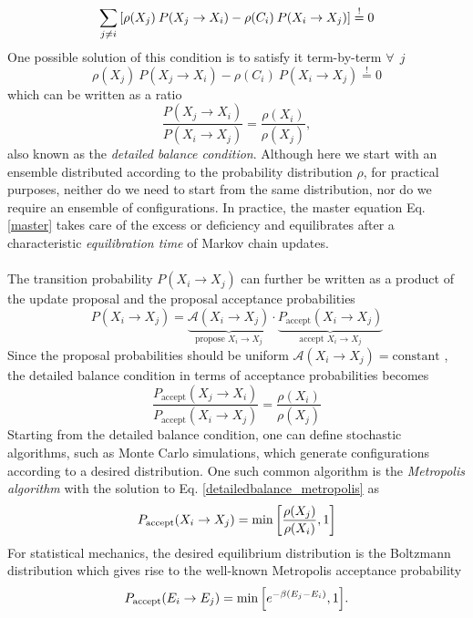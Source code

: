 \documentclass[../journal_main.tex]{subfiles}
\begin{document}
\begin{equation}
    \sum_{j\neq i} \qty[\rho(X_j) \: P(X_j \to X_i) - \rho(C_i) \: P(X_i \to X_j)] \stackrel{!}{=} 0
\end{equation}  
One possible solution of this condition is to satisfy it term-by-term $\forall \: \: j$ 
\begin{equation}
    \rho(X_j) \: P(X_j \to X_i) - \rho(C_i) \: P(X_i \to X_j) \stackrel{!}{=} 0
\end{equation}
which can be written as a ratio 
\begin{equation}
    \frac{P(X_j \to X_i)}{P(X_i \to X_j)} = \frac{\rho(X_i)}{\rho(X_j)},
    \label{detailedbalance}
\end{equation}
also known as the \textit{detailed balance condition}. Although here we start with an ensemble distributed according to the probability distribution $\rho$, for practical purposes, neither do we need to start from the same distribution, nor do we require an ensemble of configurations. In practice, the master equation Eq. \eqref{master} takes care of the excess or deficiency and equilibrates after a characteristic \textit{equilibration time} of Markov chain updates.~\\~\\
The transition probability $P(X_i \to X_j)$ can further be written as a product of the update proposal and the proposal acceptance probabilities 
\begin{equation}
    P(X_i \to X_j) = \underbrace{\mathcal{A}(X_i \to X_j)}_{\text{propose }X_i \to X_j} \cdot \underbrace{P_\text{accept}(X_i \to X_j)}_{\text{accept }X_i \to X_j}
\end{equation}
Since the proposal probabilities should be uniform $\mathcal{A}(X_i \to X_j) = \text{constant}$ , the detailed balance condition in terms of acceptance probabilities becomes 
\begin{equation}
    \frac{P_\text{accept}(X_j \to X_i)}{P_\text{accept} (X_i \to X_j)} = \frac{\rho(X_i)}{\rho(X_j)}
    \label{detailedbalance_metropolis}
\end{equation}
Starting from the detailed balance condition, one can define stochastic algorithms, such as Monte Carlo simulations, which generate configurations according to a desired distribution. One such common algorithm is the \textit{Metropolis algorithm} with the solution to Eq. \eqref{detailedbalance_metropolis} as 
\begin{equation}
    P_\text{accept}(X_i \to X_j) = \min \qty[\frac{\rho(X_j)}{\rho(X_i)}, 1]
\end{equation}
For statistical mechanics, the desired equilibrium distribution is the Boltzmann distribution which gives rise to the well-known Metropolis acceptance probability
\begin{equation}
    P_\text{accept}(E_i \to E_j) = \min \qty[e^{-\beta(E_j - E_i)}, 1]. 
    \label{metropolis}
\end{equation}
\end{document}
